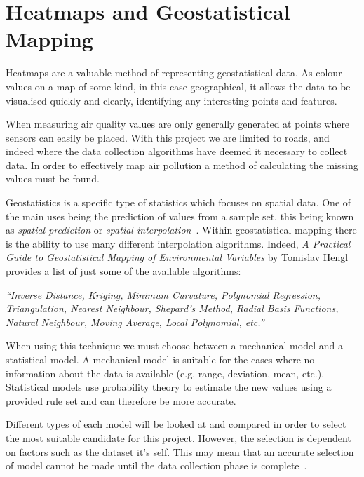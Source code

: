 \section{Heatmaps and Geostatistical Mapping}\label{geostatistics}


Heatmaps are a valuable method of representing geostatistical data. As colour values on a map of some kind, in this case geographical, it allows the data to be visualised quickly and clearly, identifying any interesting points and features.

When measuring air quality values are only generally generated at points where sensors can easily be placed. With this project we are limited to roads, and indeed where the data collection algorithms have deemed it necessary to collect data. In order to effectively map air pollution a method of calculating the missing values must be found.

Geostatistics is a specific type of statistics which focuses on spatial data. One of the main uses being the prediction of values from a sample set, this being known as \emph{spatial prediction} or \emph{spatial interpolation}~\cite{practicalguidestatisticalmapping}. Within geostatistical mapping there is the ability to use many different interpolation algorithms. Indeed, \emph{A Practical Guide to Geostatistical Mapping of Environmental Variables} by Tomislav Hengl provides a list of just some of the available algorithms: 

\emph{``Inverse Distance, Kriging, Minimum Curvature, Polynomial Regression, Triangulation, Nearest Neighbour, Shepard’s Method, Radial Basis Functions, Natural Neighbour, Moving Average, Local Polynomial, etc.''}

When using this technique we must choose between a mechanical model and a statistical model. A mechanical model is suitable for the cases where no information about the data is available (e.g. range, deviation, mean, etc.). Statistical models use probability theory to estimate the new values using a provided rule set and can therefore be more accurate. 

Different types of each model will be looked at and compared in order to select the most suitable candidate for this project. However, the selection is dependent on factors such as the dataset it's self. This may mean that an accurate selection of model cannot be made until the data collection phase is complete~\cite{mappingairpollutionusinggis}. 


